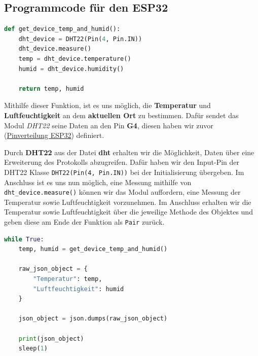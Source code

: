 \documentclass[18pt]{article}
\begin{document}
\subsection[Programmcode]{Programmcode für den ESP32}


\begin{lstlisting}[language=Python]
def get_device_temp_and_humid():
	dht_device = DHT22(Pin(4, Pin.IN))
	dht_device.measure()
	temp = dht_device.temperature()
	humid = dht_device.humidity()
	
	return temp, humid
\end{lstlisting}

Mithilfe dieser Funktion, ist es uns möglich, die \textbf{Temperatur} und \textbf{Luftfeuchtigkeit} an dem \textbf{aktuellen Ort} zu bestimmen. Dafür sendet das Modul \textit{DHT22} seine Daten an den Pin \textbf{G4}, diesen haben wir zuvor (\hyperref[tab:teil_1_steckbrett_esp32]{Pinverteilung ESP32}) definiert.

Durch \textbf{DHT22} aus der Datei \textbf{dht} erhalten wir die Möglichkeit, Daten über eine Erweiterung des Protokolls abzugreifen. Dafür haben wir den Input-Pin der DHT22 Klasse \texttt{DHT22(Pin(4, Pin.IN))} bei der Initialisierung übergeben. Im Anschluss ist es uns nun möglich, eine Messung mithilfe von \texttt{dht\_device.measure()} können wir das Modul auffordern, eine Messung der Temperatur sowie Luftfeuchtigkeit vorzunehmen. Im Anschluss erhalten wir die Temperatur sowie Luftfeuchtigkeit über die jeweilige Methode des Objektes und geben diese am Ende der Funktion als \texttt{Pair} zurück.
\newline


\begin{lstlisting}[language=Python]
while True:
	temp, humid = get_device_temp_and_humid()

	raw_json_object = {
		"Temperatur": temp,
		"Luftfeuchtigkeit": humid
	}

	json_object = json.dumps(raw_json_object)

	print(json_object)
	sleep(1)
\end{lstlisting}
\end{document}
